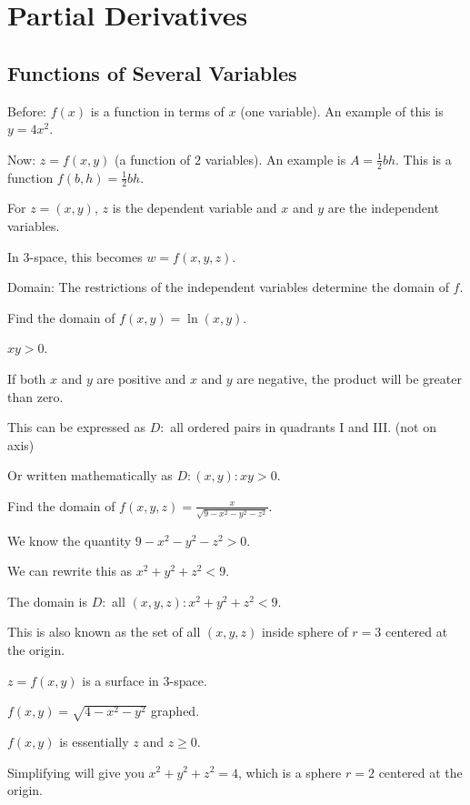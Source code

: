 \documentclass[../calc3.tex]{subfiles}
\begin{document}
\chapter{Partial Derivatives}
\section{Functions of Several Variables}
Before: $f(x)$ is a function in terms of $x$ (one variable). An example of this is $y=4x^2$.

Now: $z=f(x,y)$ (a function of $2$ variables). An example is $A=\frac{1}{2}bh$. This is a function $f(b,h)=\frac{1}{2}bh$.

For $z=(x,y)$, $z$ is the dependent variable and $x$ and $y$ are the independent variables.

In 3-space, this becomes $w=f(x,y,z)$.

Domain: The restrictions of the independent variables determine the domain of $f$.

\begin{example}
    Find the domain of $f(x,y)=\ln(x,y)$.

    $xy>0$.

    If both $x$ and $y$ are positive and $x$ and $y$ are negative, the product will be greater than zero.

    This can be expressed as $D:$ all ordered pairs in quadrants I and III. (not on axis)

    Or written mathematically as $D: (x,y): xy>0$.
\end{example}

\begin{example}
    Find the domain of $f(x,y,z)=\frac{x}{\sqrt{9-x^2-y^2-z^2}}$.

    We know the quantity $9-x^2-y^2-z^2>0$.

    We can rewrite this as $x^2+y^2+z^2<9$.

    The domain is $D:$ all $(x,y,z): x^2+y^2+z^2<9$.

    This is also known as the set of all $(x,y,z)$ inside sphere of $r=3$ centered at the origin.
\end{example}

$z=f(x,y)$ is a surface in 3-space.

\begin{example}
    $f(x,y)=\sqrt{4-x^2-y^2}$ graphed.

    $f(x,y)$ is essentially $z$ and $z\geq 0$.

    Simplifying will give you $x^2+y^2+z^2=4$, which is a sphere $r=2$ centered at the origin.    
\end{example}
\end{document}
